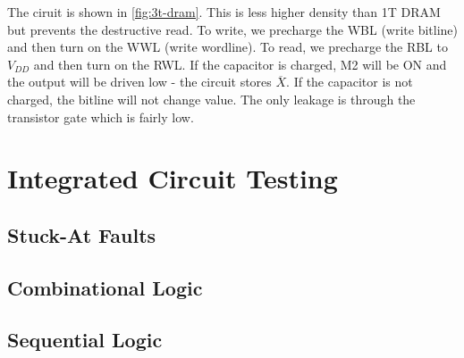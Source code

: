 \documentclass[11pt]{report}
\begin{document}
The ciruit is shown in \autoref{fig:3t-dram}. This is less higher density than 1T DRAM but prevents the destructive read. To write, we precharge the WBL (write bitline) and then turn on the WWL (write wordline). To read, we precharge the RBL to $V_{DD}$ and then turn on the RWL. If the capacitor is charged, M2 will be ON and the output will be driven low - the circuit stores $\overline{X}$. If the capacitor is not charged, the bitline will not change value. The only leakage is through the transistor gate which is fairly low.

\chapter{Integrated Circuit Testing}

\section{Stuck-At Faults}
\section{Combinational Logic}
\section{Sequential Logic}
\end{document}
